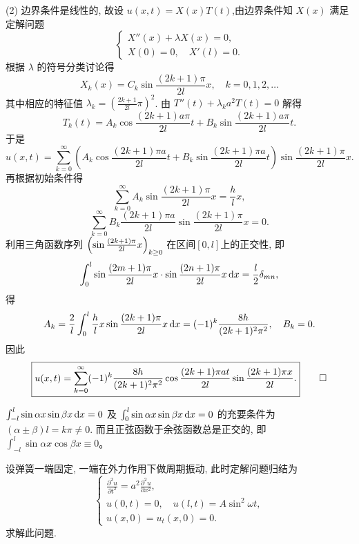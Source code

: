 \begin{solve}
  (2) 边界条件是线性的, 故设 $u(x,t)=X(x)T(t)$,由边界条件知 $X(x)$ 满足定解问题
  \[\begin{cases}
    X''(x)+\lambda X(x) = 0, \\
    X(0) = 0,\quad X'(l) = 0.
  \end{cases}\]
  根据 $\lambda$ 的符号分类讨论得
  \[X_k(x)=C_k\sin \frac{(2k+1)\pi}{2l}x,\quad k=0,1,2,\ldots\]
  其中相应的特征值 $\lambda_k=\left(\frac{2k+1}{2l}\pi\right)^2$.
  由 $T''(t)+\lambda_k a^2T(t)=0$ 解得
  \[T_k(t) = A_k\cos\frac{(2k+1)a\pi}{2l}t+B_k\sin \frac{(2k+1)a\pi}{2l}t.\]
  于是
  \[u(x,t) = \sum_{k=0}^{\infty}\left(A_k\cos\frac{(2k+1)\pi a}{2l}t
    + B_k\sin \frac{(2k+1)\pi a}{2l}t\right)\sin \frac{(2k+1)\pi}{2l}x.\]
  再根据初始条件得
  \[\sum_{k=0}^{\infty}A_k\sin \frac{(2k+1)\pi}{2l}x=\frac{h}{l}x,\]
  \[\sum_{k=0}^{\infty}B_k\frac{(2k+1)\pi a}{2l}\sin \frac{(2k+1)\pi}{2l}x = 0.\]
  利用三角函数序列 $\Bigl(\sin \frac{(2k+1)\pi}{2l}x\Bigr)_{k\geq 0}$
  在区间$[0,l]$上的正交性, 即
  \[\int_0^l\sin \frac{(2m+1)\pi}{2l}x\cdot\sin \frac{(2n+1)\pi}{2l}x\mathop{}\!\mathrm{d} x
    = \frac{l}{2}\delta_{mn},\]
  得
  \[A_k=\frac{2}{l}\int_0^l\frac{h}{l}x\sin \frac{(2k+1)\pi}{2l}x\mathop{}\!\mathrm{d} x
    =(-1)^k\frac{8h}{(2k+1)^2\pi^2},\quad B_k = 0.\]
  因此
  \[\boxed{u(x,t) = \sum_{k=0}^{\infty}(-1)^k\frac{8h}{(2k+1)^2\pi^2}\cos\frac{(2k+1)\pi at}{2l}
    \sin\frac{(2k+1)\pi x}{2l}.}\qedhere\]
\end{solve}

\begin{remark}
  $\int_{-l}^l\sin\alpha x\sin\beta x\mathop{}\!\mathrm{d} x=0$ 及 $\int_0^l\sin\alpha x\sin\beta x\mathop{}\!\mathrm{d} x=0$
  的充要条件为 $(\alpha\pm\beta)l=k\pi\neq 0$. 而且正弦函数于余弦函数总是正交的, 
  即 $\int_{-l}^l\sin\alpha x\cos\beta x\equiv 0$。
\end{remark}


\begin{exercise}
  设弹簧一端固定, 一端在外力作用下做周期振动, 此时定解问题归结为
  \[\begin{cases}
    \frac{\partial^2u}{\partial t^2} = a^2 \frac{\partial^2u}{\partial x^2}, \\
    u(0,t) = 0, \quad u(l,t) = A\sin^2\omega t, \\
    u(x,0) = u_t(x,0) = 0.
  \end{cases}\]
  求解此问题.
\end{exercise}

